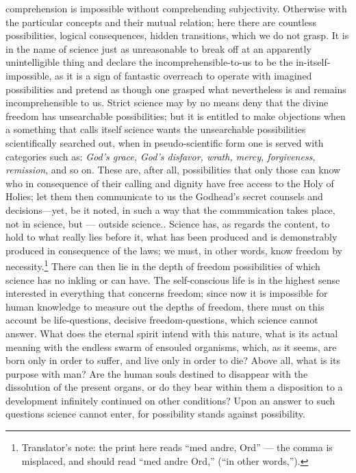 \documentclass[12pt]{article}
\begin{document}
{comprehension is impossible without comprehending subjectivity. Otherwise with
the particular concepts and their mutual relation; here there are countless
possibilities, logical consequences, hidden transitions, which we do not
grasp. It is in the name of science just as unreasonable to break off at an
apparently unintelligible thing and declare the incomprehensible-to-us to be
the in-itself-impossible, as it is a sign of fantastic overreach to operate
with imagined possibilities and pretend as though one grasped what nevertheless
is and remains incomprehensible to us. Strict science may by no means deny
that the divine freedom has unsearchable possibilities; but it is entitled to
make objections when a something that calls itself science wants the
unsearchable possibilities scientifically searched out, when in
pseudo-scientific form one is served with categories such as: \emph{God's
grace, God's disfavor, wrath, mercy, forgiveness, remission}, and so on. These
are, after all, possibilities that only those can know who in consequence of
their calling and dignity have free access to the Holy of Holies; let them then
communicate to us the Godhead's secret counsels and decisions—yet, be it
noted, in such a way that the communication takes place, not in science, but
--- outside science.}. Science has, as regards the content,
to hold to what really lies before it, what has been produced and is
demonstrably produced in consequence of the laws; we must,
in other words, know freedom by necessity.\footnote{Translator's note: the
print here reads ``med andre, Ord'' — the comma is misplaced, and should read
``med andre Ord,'' (``in other words,'').} There can then lie in the depth of
freedom possibilities of which science has no inkling or can have. The
self-conscious life is in the highest sense interested in everything that
concerns freedom; since now it is impossible for human knowledge to measure
out the depths of freedom, there must on this account be life-questions,
decisive freedom-questions, which science cannot answer. What does the eternal
spirit intend with this nature, what is
its actual meaning with the endless swarm of ensouled organisms, which, as it
seems, are born only in order to suffer, and live only in order to die? Above
all, what is its purpose with man? Are the human souls destined to disappear
with the dissolution of the present organs, or do they bear within them a
disposition to a development infinitely continued on other conditions? Upon an
answer to such questions science cannot enter, for possibility stands against
possibility.
\end{document}
